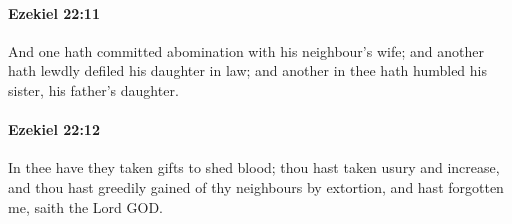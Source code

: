 		\paragraph{Ezekiel 22:11} %
			\label{EZEKIEL-22-11}

			And one hath committed abomination with his neighbour’s wife; and another hath lewdly defiled his daughter in law; and another in thee hath humbled his sister, his father’s daughter.


		\paragraph{Ezekiel 22:12} %
			\label{EZEKIEL-22-12}

			In thee have they taken gifts to shed blood; thou hast taken usury and increase, and thou hast greedily gained of thy neighbours by extortion, and hast forgotten me, saith the Lord GOD.

